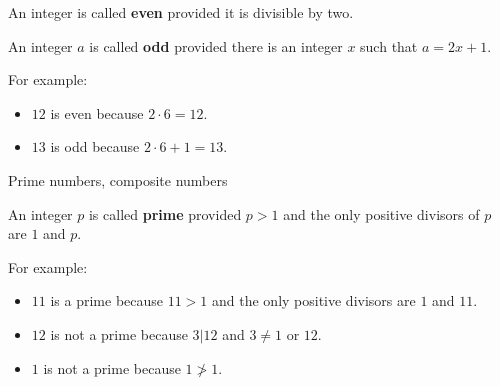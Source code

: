 \documentclass{beamer}
\begin{document}
\begin{frame}[t]
\vspace{1.5cm}
\begin{definition}
An integer is called \textbf{even} provided it is divisible by two.
\end{definition}
\begin{definition}
An integer $a$ is called \textbf{odd} provided there is an integer $x$ such that $a=2x+1$.
\end{definition}
For example:
\begin{itemize}
\item<2-> $12$ is even because $2\cdot 6 = 12$.
\item<4-> $13$ is odd because $2\cdot 6 + 1 = 13$.
\end{itemize}
\end{frame}

\begin{frame}[t]{Prime numbers, composite numbers}
\vspace{0.5cm}
\begin{definition}
An integer $p$ is called \textbf{prime} provided $p>1$ and the only positive divisors of $p$ are $1$ and $p$.
\end{definition}

For example:
\begin{itemize}
\item<3-> $11$ is a prime because $11>1$ and the only positive divisors are $1$ and $11$.
\item <5-> $12$ is not a prime because $3|12$ and $3\neq 1$ or $12$.
\item <7-> $1$ is not a prime because $1\ngtr1$.
\end{itemize}
\end{frame}
\end{document}
